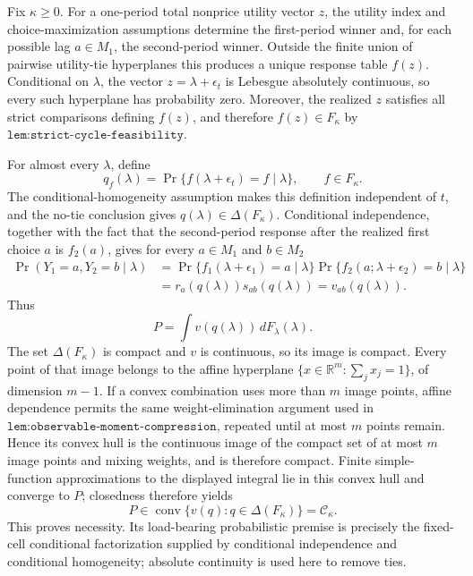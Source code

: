 Fix \(\kappa\ge0\).  For a one-period total nonprice utility vector \(z\), the utility index and choice-maximization assumptions determine the first-period winner and, for each possible lag \(a\in M_1\), the second-period winner.  Outside the finite union of pairwise utility-tie hyperplanes this produces a unique response table \(f(z)\).  Conditional on \(\lambda\), the vector \(z=\lambda+\epsilon_t\) is Lebesgue absolutely continuous, so every such hyperplane has probability zero.  Moreover, the realized \(z\) satisfies all strict comparisons defining \(f(z)\), and therefore \(f(z)\in F_\kappa\) by \(\texttt{lem:strict-cycle-feasibility}\).

For almost every \(\lambda\), define
\[
 q_f(\lambda)
 =\Pr\{f(\lambda+\epsilon_t)=f\mid\lambda\},
 \qquad f\in F_\kappa.
\]
The conditional-homogeneity assumption makes this definition independent of \(t\), and the no-tie conclusion gives \(q(\lambda)\in\Delta(F_\kappa)\).  Conditional independence, together with the fact that the second-period response after the realized first choice \(a\) is \(f_2(a)\), gives for every \(a\in M_1\) and \(b\in M_2\)
\[
 \begin{aligned}
 \Pr(Y_1=a,Y_2=b\mid\lambda)
 &=\Pr\{f_1(\lambda+\epsilon_1)=a\mid\lambda\}
   \Pr\{f_2(a;\lambda+\epsilon_2)=b\mid\lambda\}\\
 &=r_a(q(\lambda))s_{ab}(q(\lambda))
 =v_{ab}(q(\lambda)).
 \end{aligned}
\]
Thus
\[
 P=\int v(q(\lambda))\,dF_\lambda(\lambda).
\]
The set \(\Delta(F_\kappa)\) is compact and \(v\) is continuous, so its image is compact.  Every point of that image belongs to the affine hyperplane \(\{x\in\mathbb R^m:\sum_jx_j=1\}\), of dimension \(m-1\).  If a convex combination uses more than \(m\) image points, affine dependence permits the same weight-elimination argument used in \(\texttt{lem:observable-moment-compression}\), repeated until at most \(m\) points remain.  Hence its convex hull is the continuous image of the compact set of at most \(m\) image points and mixing weights, and is therefore compact.  Finite simple-function approximations to the displayed integral lie in this convex hull and converge to \(P\); closedness therefore yields
\[
 P\in\operatorname{conv}\{v(q):q\in\Delta(F_\kappa)\}=\mathcal C_\kappa.
\]
This proves necessity.  Its load-bearing probabilistic premise is precisely the fixed-cell conditional factorization supplied by conditional independence and conditional homogeneity; absolute continuity is used here to remove ties.

